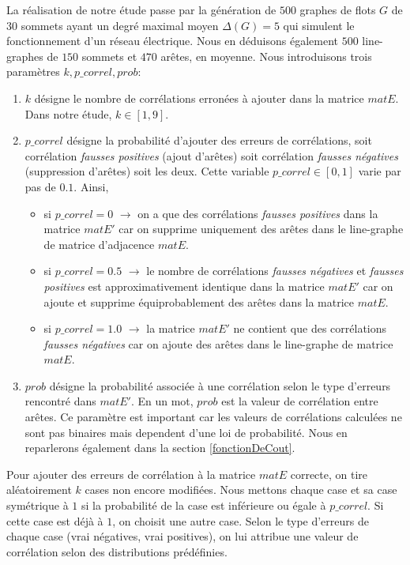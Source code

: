La r\'ealisation de notre \'etude passe par la g\'en\'eration de $500$ graphes de flots $G$ de $30$ sommets ayant un degr\'e maximal moyen $\Delta(G) = 5$ qui simulent le fonctionnement d'un r\'eseau \'electrique. Nous en d\'eduisons \'egalement $500$ line-graphes de $150$ sommets et $470$ ar\^etes, en moyenne. \newline
Nous introduisons trois param\`etres $k, p\_correl, prob$:
\begin{enumerate}
\item $k$ d\'esigne le nombre de corr\'elations erron\'ees \`a ajouter dans la matrice $matE$. Dans notre \'etude, $k \in [1,9]$.
\item $p\_correl$ d\'esigne la probabilit\'e d'ajouter des erreurs de corr\'elations, soit corr\'elation {\em fausses positives} (ajout d'ar\^etes) soit corr\'elation {\em fausses n\'egatives} (suppression d'ar\^etes) soit les deux. Cette variable $p\_correl \in [0,1]$ varie par pas de $0.1$. Ainsi,
	\begin{itemize}
	\item si $p\_correl=0$ $\rightarrow$ on a que des corr\'elations {\em fausses positives} dans la matrice $matE'$ car on supprime uniquement des ar\^etes dans le line-graphe de matrice d'adjacence $matE$.
	\item si $p\_correl=0.5$ $\rightarrow$ le nombre de corr\'elations {\em fausses n\'egatives} et  {\em fausses positives} est approximativement identique  dans la matrice $matE'$ car on ajoute et supprime \'equiprobablement des ar\^etes dans la matrice $matE$.
	\item si $p\_correl=1.0$ $\rightarrow$ la matrice $matE'$ ne contient que des corr\'elations {\em fausses n\'egatives} car on ajoute des ar\^etes dans le line-graphe de matrice $matE$.
	\end{itemize}
\item $prob$ d\'esigne la probabilit\'e associ\'ee \`a une corr\'elation selon le type d'erreurs rencontr\'e dans $matE'$. En un mot, $prob$ est la valeur de corr\'elation entre ar\^etes.
Ce param\`etre est important car les valeurs de corr\'elations calcul\'ees  ne sont pas binaires mais dependent d'une loi de probabilit\'e. Nous en reparlerons \'egalement dans la section \ref{fonctionDeCout}.
\end{enumerate}
Pour ajouter des erreurs de corr\'elation \`a la matrice $matE$ correcte, on tire al\'eatoirement $k$ cases non encore modifi\'ees. Nous mettons chaque case et sa case sym\'etrique \`a $1$ si la probabilit\'e de la case est inf\'erieure ou \'egale \`a $p\_correl$. Si cette case est d\'ej\`a \`a $1$, on choisit une autre case. Selon le type d'erreurs de chaque case (vrai n\'egatives, vrai positives), on lui attribue une valeur de corr\'elation selon des distributions pr\'ed\'efinies.
\newline

